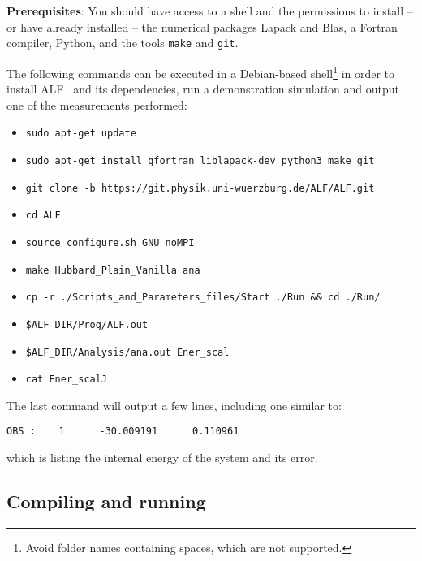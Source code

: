 \textbf{Prerequisites}:
You should have access to a shell and the permissions to install -- or have already installed -- the numerical packages Lapack and Blas, a Fortran compiler, Python, and the tools \texttt{make} and \texttt{git}. 

The following commands can be executed in a Debian-based shell\footnote{Avoid folder names containing spaces, which are not supported.} in order to install ALF~\ALFver{} and its dependencies, run a demonstration simulation and output one of the measurements performed:
\begin{itemize}[itemsep=0pt]
	\item \lstinline[style=bash,morekeywords={sudo}]{sudo apt-get update}
	\item \lstinline[style=bash,morekeywords={sudo}]{sudo apt-get install gfortran liblapack-dev python3 make git}
	\item \lstinline[style=bash]{git clone -b }\texttt{\ALFbranch}\lstinline[style=bash]{https://git.physik.uni-wuerzburg.de/ALF/ALF.git}
	\item \lstinline[style=bash,morekeywords={cd}]{cd ALF}
	\item \lstinline[style=bash,morekeywords={source}]{source configure.sh GNU noMPI}
	\item \lstinline[style=bash,morekeywords={make}]{make Hubbard_Plain_Vanilla ana}
	\item \lstinline[style=bash,morekeywords={cp}]{cp -r ./Scripts_and_Parameters_files/Start ./Run && cd ./Run/}
	\item \lstinline[style=bash,morekeywords={}]{$ALF_DIR/Prog/ALF.out}
	\item \lstinline[style=bash,morekeywords={}]{$ALF_DIR/Analysis/ana.out Ener_scal}
	\item \lstinline[style=bash,morekeywords={}]{cat Ener_scalJ}
\end{itemize}
The last command will output a few lines, including one similar to:
\begin{lstlisting}[style=bash]
OBS :    1      -30.009191      0.110961
\end{lstlisting}
which is listing the internal energy of the system and its error.

\subsection{Compiling and running}
\label{sec:compilation}

